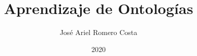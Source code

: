 \documentclass[12pt,twoside]{thesis}
\title{Aprendizaje de Ontologías}
\author{José Ariel Romero Costa}
\date{2020}
\begin{document}
	\let\cleardoublepage\clearpage

	\frontmatter
	\maketitle

	
	
	
	
	
	

	\mainmatter

	

	

	

	

	

	\backmatter

	

	
\end{document}
